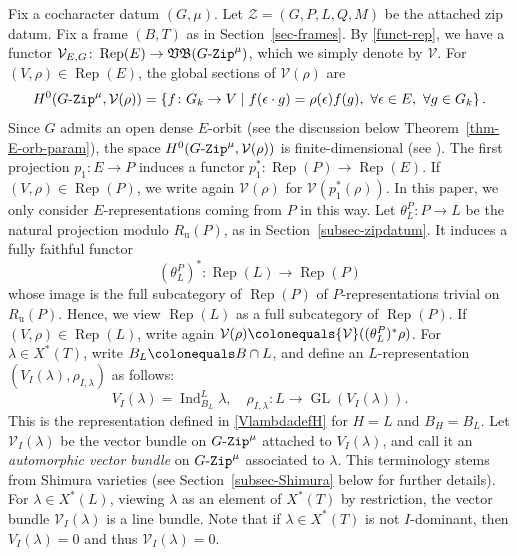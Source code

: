 \documentclass[11pt]{amsart}
\numberwithin{equation}{section}
\theoremstyle{definition}
\theoremstyle{remark}
\newcommand{\GZip}{\mathop{\text{$G$-{\tt Zip}}}\nolimits}
\newcommand{\VB}{\mathfrak{VB}}
\newcommand{\Vcal}{{\mathcal V}}
\newcommand{\Zcal}{{\mathcal Z}}
\DeclareMathOperator{\Rep}{Rep}
\DeclareMathOperator{\GL}{GL}
\DeclareMathOperator{\Ind}{Ind}
\newcommand{\lra}{\longrightarrow}
\begin{document}
Fix a cocharacter datum $(G,\mu)$. Let $\Zcal=(G,P,L,Q,M)$ be the attached zip datum. Fix a frame $(B,T)$ as in Section~\ref{sec-frames}. By \eqref{funct-rep}, we have a functor $\Vcal_{E,G}\colon \Rep(E)\to \VB(\GZip^\mu)$, which we simply denote by $\Vcal$. For $(V,\rho)\in \Rep(E)$, the global sections of $\Vcal(\rho)$ are
\[
 H^0(\GZip^\mu,\Vcal(\rho))=\left\{f \colon G_k \to V \mid f(\epsilon \cdot g)=\rho(\epsilon) f(g) , \ \forall\epsilon\in E, \ \forall g\in G_k \right\}.
\]
Since $G$ admits an open dense $E$-orbit (see the discussion below Theorem~\ref{thm-E-orb-param}), the space $H^0(\GZip^\mu,\Vcal(\rho))$ is finite-dimensional (see \cite[Lemma 1.2.1]{Koskivirta-automforms-GZip}). The first projection $p_1 \colon E\to P$ induces a functor $p_1^* \colon \Rep(P)\to \Rep(E)$. If $(V,\rho)\in \Rep(P)$, we write again $\Vcal(\rho)$ for $\Vcal(p_1^*(\rho))$. In this paper, we only consider $E$-representations coming from $P$ in this way. Let $\theta^P_L \colon P\to L$ be the natural projection modulo $R_{\mathrm{u}}(P)$, as in Section~\ref{subsec-zipdatum}. It induces a fully faithful functor
\begin{equation}
(\theta^P_L)^* \colon \Rep(L)\lra \Rep(P)  
\end{equation}
whose image is the full subcategory of $\Rep(P)$ of $P$-representations trivial on $R_{\mathrm{u}}(P)$. Hence, we view $\Rep(L)$ as a full subcategory of $\Rep(P)$. If $(V,\rho)\in \Rep(L)$, write again $\Vcal(\rho) \colonequals \Vcal((\theta^P_L)^*\rho)$. For $\lambda\in X^*(T)$, write $B_L \colonequals B\cap L$, and define an $L$-representation $(V_I(\lambda),\rho_{I,\lambda})$ as follows: 
\begin{equation}\label{equ-VlambdaL}
V_I(\lambda)=\Ind_{B_L}^L \lambda, \quad \rho_{I,\lambda}\colon L\lra \GL(V_I(\lambda)). 
\end{equation}
This is the representation defined in \eqref{VlambdadefH} for $H=L$ and $B_H=B_L$. Let $\Vcal_I(\lambda)$ be the vector bundle on $\GZip^\mu$ attached to $V_I(\lambda)$, and call it an \emph{automorphic vector bundle} on $\GZip^\mu$ associated to $\lambda$. This terminology stems from Shimura varieties (see Section~\ref{subsec-Shimura} below for further details). For $\lambda \in X^*(L)$, viewing $\lambda$ as an element of $X^*(T)$ by restriction, the vector bundle $\Vcal_I(\lambda)$ is a line bundle. Note that if $\lambda\in X^*(T)$ is not $I$-dominant, then $V_I(\lambda)=0$ and thus $\Vcal_I(\lambda)=0$.
\end{document}
